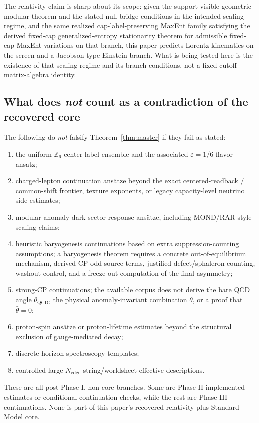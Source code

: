 \documentclass[11pt]{article}
\begin{document}
The relativity claim is sharp about its scope: given the support-visible geometric-modular theorem and the stated null-bridge conditions in the intended scaling regime, and the same realized cap-label-preserving MaxEnt family satisfying the derived fixed-cap generalized-entropy stationarity theorem for admissible fixed-cap MaxEnt variations on that branch, this paper predicts Lorentz kinematics on the screen and a Jacobson-type Einstein branch. What is being tested here is the existence of that scaling regime and its branch conditions, not a fixed-cutoff matrix-algebra identity.

\subsection{What does \emph{not} count as a contradiction of the recovered core}

The following do \emph{not} falsify Theorem~\ref{thm:master} if they fail as stated:
\begin{enumerate}[leftmargin=2em]
\item the uniform $\mathbb Z_6$ center-label ensemble and the associated $\varepsilon=1/6$ flavor ansatz;
\item charged-lepton continuation ans\"atze beyond the exact centered-readback / common-shift frontier, texture exponents, or legacy capacity-level neutrino side estimates;
\item modular-anomaly dark-sector response ans\"atze, including MOND/RAR-style scaling claims;
\item heuristic baryogenesis continuations based on extra suppression-counting assumptions; a baryogenesis theorem requires a concrete out-of-equilibrium mechanism, derived CP-odd source terms, justified defect/sphaleron counting, washout control, and a freeze-out computation of the final asymmetry;
\item strong-CP continuations; the available corpus does not derive the bare QCD angle \(\theta_{\mathrm{QCD}}\), the physical anomaly-invariant combination \(\bar\theta\), or a proof that \(\bar\theta=0\);
\item proton-spin ans\"atze or proton-lifetime estimates beyond the structural exclusion of gauge-mediated decay;
\item discrete-horizon spectroscopy templates;
\item controlled large-$N_{\mathrm{edge}}$ string/worldsheet effective descriptions.
\end{enumerate}
These are all post-Phase-I, non-core branches. Some are Phase-II implemented estimates or conditional continuation checks, while the rest are Phase-III continuations. None is part of this paper's recovered relativity-plus-Standard-Model core.
\end{document}
